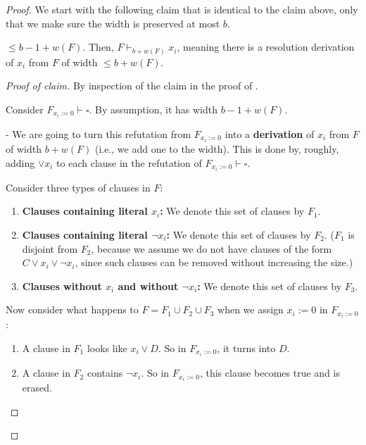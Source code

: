 \begin{proof}
We start with the following claim that is identical to the claim above, only that we make sure the width  is preserved at most $b$.
\begin{claim}
 $\leq b - 1 + w(F)$. Then, $F \vdash_{b + w(F)} x_i$, meaning there is a resolution derivation of $x_i$ from $F$ of width $\leq b + w(F)$.

\end{claim}

\begin{proof}[Proof of claim]
By inspection of the claim in the proof of .


Consider $F_{x_i := 0} \vdash \square$. By assumption, it has width $b - 1 + w(F)$.

- We are going to turn this refutation from $F_{x_i := 0}$ into a \textbf{derivation} of $x_i$ from $F$ of width $b + w(F)$ (i.e., we add one to the width).  
  This is done by, roughly, adding $\lor x_i$ to each clause in the refutation of $F_{x_i := 0} \vdash \square$.

 Consider three types of clauses in $F$:

  \begin{enumerate}
      \item \textbf{Clauses containing literal $x_i$:}  
      We denote this set of clauses by $F_1$.
      
      \item \textbf{Clauses containing literal $\neg x_i$:}  
      We denote this set of clauses by $F_2$.  
      ($F_1$ is disjoint from $F_2$, because we assume we do not have clauses of the form $C \lor x_i \lor \neg x_i$, since such clauses can be removed without increasing the size.)

      \item \textbf{Clauses without $x_i$ and without $\neg x_i$:}  
      We denote this set of clauses by $F_3$.
  \end{enumerate}
 

Now consider what happens to $F = F_1 \cup F_2 \cup F_3$  
when we assign $x_i := 0$ in $F_{x_i := 0}$:

\begin{enumerate}
    \item A clause in $F_1$ looks like $x_i \lor D$.  
    So in $F_{x_i := 0}$, it turns into $D$.
    
    \item A clause in $F_2$ contains $\neg x_i$.  
    So in $F_{x_i := 0}$, this clause becomes true and is erased.
    

\end{enumerate}
\end{proof}
\end{proof}
